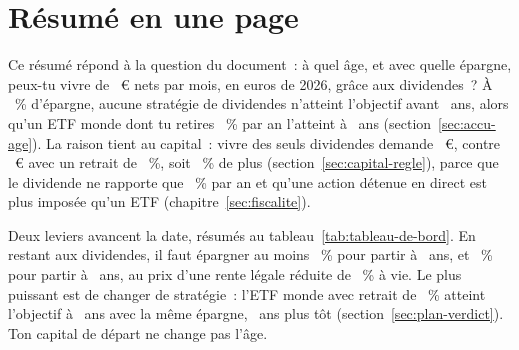 \section{R\'esum\'e en une page}\label{sec:resume}

Ce r\'esum\'e r\'epond \`a la question du document~: \`a quel \^age, et avec quelle \'epargne,
peux-tu vivre de \ZielMonat~€ nets par mois, en euros de 2026, gr\^ace aux dividendes~?  \`A \SparquoteZwanzig~\% d'\'epargne, aucune strat\'egie de dividendes
n'atteint l'objectif avant \AlterHorizon~ans, alors qu'un ETF monde dont tu retires \TauxRetrait~\%
par an l'atteint \`a \AlterEtfReferenzZwanzig~ans (section~\ref{sec:accu-age}). La raison tient au
capital~: vivre des seuls dividendes demande \KapitalMaisonSiebzig~€, contre \KapitalEtfReferenz~€
avec un retrait de \TauxRetrait~\%, soit \KapitalDifferenzSiebzigProzent~\% de plus
(section~\ref{sec:capital-regle}), parce que le dividende ne rapporte que \RenditeDivMaison~\% par an
et qu'une action d\'etenue en direct est plus impos\'ee qu'un ETF (chapitre~\ref{sec:fiscalite}).

Deux leviers avancent la date, r\'esum\'es au tableau~\ref{tab:tableau-de-bord}. En restant aux
dividendes, il faut \'epargner au moins \QuoteAnticipeeMaisonSiebzig~\% pour partir \`a
\AlterAnticipeeMaisonSiebzig~ans, et \SparquoteFuenfzig~\% pour partir \`a
\AlterMaisonSiebzigFuenfzig~ans, au prix d'une rente l\'egale r\'eduite de \RenteBrueckePerteProzent~\%
\`a vie. Le plus puissant est de changer de strat\'egie~: l'ETF monde avec retrait de \TauxRetrait~\%
atteint l'objectif \`a \AlterEtfBasis~ans avec la m\^eme \'epargne, \EcartAgeEtfMaisonBasis~ans plus
t\^ot (section~\ref{sec:plan-verdict}). Ton capital de d\'epart ne change pas l'\^age.

